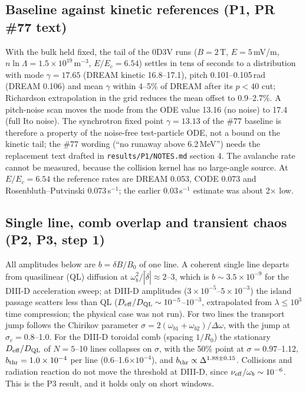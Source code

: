 \documentclass[10pt,a4paper]{article}
\begin{document}
\subsection{Baseline against kinetic references (P1, PR \#77 text)}
With the bulk held fixed, the tail of the 0D3V runs ($B=2$\,T, $E=5$\,mV/m, $n\ln\Lambda=1.5\times10^{19}$\,m$^{-3}$, $E/E_c=6.54$)
settles in tens of seconds to a distribution with mode $\gamma=17.65$ (DREAM kinetic 16.8--17.1), pitch 0.101--0.105\,rad
(DREAM 0.106) and mean $\gamma$ within 4--5\% of DREAM after its $p<40$ cut; Richardson extrapolation in the grid reduces the
mean offset to 0.9--2.7\%. A pitch-noise scan moves the mode from the ODE value 13.16 (no noise) to 17.4 (full Ito noise).
The synchrotron fixed point $\gamma=13.13$ of the \#77 baseline is therefore a property of the noise-free test-particle ODE, not a
bound on the kinetic tail; the \#77 wording (``no runaway above 6.2\,MeV'') needs the replacement text drafted in \texttt{results/P1/NOTES.md}
section 4. The avalanche rate cannot be measured, because the collision kernel has no large-angle source. At $E/E_c=6.54$ the
reference rates are DREAM 0.053, CODE 0.073 and Rosenbluth--Putvinski 0.073\,s$^{-1}$; the earlier 0.03\,s$^{-1}$ estimate was about 2$\times$ low.

\subsection{Single line, comb overlap and transient chaos (P2, P3, step 1)}
All amplitudes below are $b=\delta B/B_0$ of one line. A coherent single line departs from quasilinear (QL) diffusion at
$\omega_b^2/|\dot\delta|\approx2$--3, which is $b\sim3.5\times10^{-9}$ for the DIII-D acceleration sweep; at DIII-D amplitudes
($3\times10^{-5}$--$5\times10^{-3}$) the island passage scatters less than QL ($D_{\rm eff}/D_{\rm QL}\sim10^{-5}$--$10^{-3}$, extrapolated from
$\lambda\le10^3$ time compression; the physical case was not run). For two lines the transport jump follows the Chirikov parameter
$\sigma=2(\omega_{b1}+\omega_{b2})/\Delta\omega$, with the jump at $\sigma_c=0.8$--1.0. For the DIII-D toroidal comb (spacing $1/R_0$) the
stationary $D_{\rm eff}/D_{\rm QL}$ of $N=5$--10 lines collapses on $\sigma$, with the 50\% point at $\sigma=0.97$--1.12,
$b_{\rm thr}=1.0\times10^{-4}$ per line (0.6--1.6$\times10^{-4}$), and $b_{\rm thr}\propto\Delta^{1.88\pm0.15}$. Collisions and radiation reaction
do not move the threshold at DIII-D, since $\nu_{\rm eff}/\omega_b\sim10^{-6}$. This is the P3 result, and it holds only on short windows.
\end{document}
